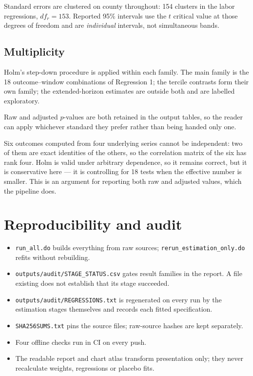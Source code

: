 \documentclass[11pt,a4paper]{article}
\newcommand{\caution}[2]{\begin{tcolorbox}[warnbox,title={#1}]#2\end{tcolorbox}}
\newcommand{\file}[1]{\texttt{\small #1}}
\begin{document}
Standard errors are clustered on county throughout: 154 clusters in the labor
regressions, $df_r = 153$. Reported 95\% intervals use the $t$ critical value
at those degrees of freedom and are \emph{individual} intervals, not
simultaneous bands.

\subsection{Multiplicity}

Holm's step-down procedure is applied within each family. The main family is
the 18 outcome--window combinations of Regression 1; the tercile contrasts form
their own family; the extended-horizon estimates are outside both and are
labelled exploratory.

Raw and adjusted $p$-values are both retained in the output tables, so the
reader can apply whichever standard they prefer rather than being handed only
one.

\caution{The tests within a family are not independent}{%
Six outcomes computed from four underlying series cannot be independent: two of
them are exact identities of the others, so the correlation matrix of the six
has rank four. Holm is valid under arbitrary dependence, so it remains correct,
but it is conservative here --- it is controlling for 18 tests when the
effective number is smaller. This is an argument for reporting both raw and
adjusted values, which the pipeline does.}

\section{Reproducibility and audit}

\begin{itemize}[leftmargin=1.3em,itemsep=2pt]
\item \file{run\_all.do} builds everything from raw sources;
      \file{rerun\_estimation\_only.do} refits without rebuilding.
\item \file{outputs/audit/STAGE\_STATUS.csv} gates result families in the
      report. A file existing does not establish that its stage succeeded.
\item \file{outputs/audit/REGRESSIONS.txt} is regenerated on every run by the
      estimation stages themselves and records each fitted specification.
\item \file{SHA256SUMS.txt} pins the source files; raw-source hashes are kept
      separately.
\item Four offline checks run in CI on every push.
\item The readable report and chart atlas transform presentation only; they
      never recalculate weights, regressions or placebo fits.
\end{itemize}
\end{document}
